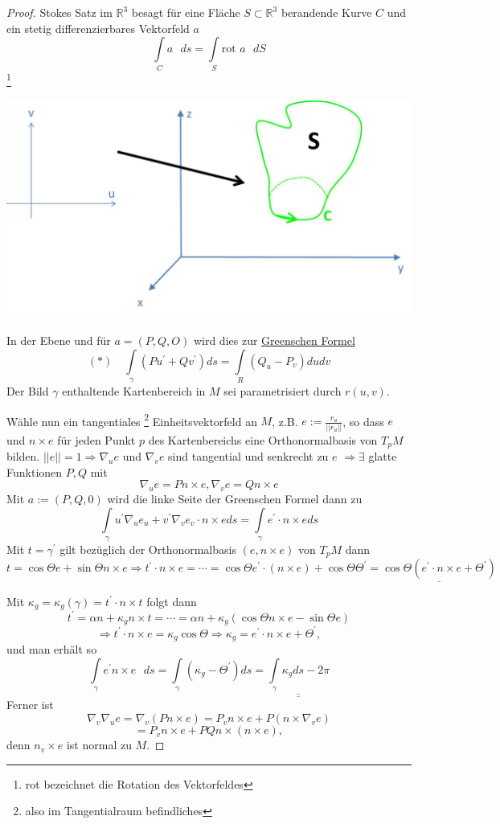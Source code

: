 \documentclass[a4paper,11pt,notitlepage]{report}
\theoremstyle{definition}
\newcommand{\R}{{\ensuremath{\mathbb{R}}}}
\begin{document}
\begin{proof}
	Stokes Satz im $\R^3$ besagt für eine Fläche $S \subset \R^3$ berandende Kurve $C$ und ein stetig differenzierbares Vektorfeld $a$
	$$\int\limits_{C}{a \text{ } ds} = \int\limits_{S}{\text{rot }a \text{ } dS}$$ \footnote{rot bezeichnet die Rotation des Vektorfeldes}
	\begin{center}
		\includegraphics[scale=0.3]{images/2012_02_02_Bild3.jpg}
	\end{center}
	In der Ebene und für $a =(P,Q,O)$ wird dies zur \underline{Greenschen Formel}
	$$(*) \quad \int\limits_{\gamma}{(P u^\prime + Q v^\prime) ds} = \int\limits_{R}{(Q_u - P_v) dudv}$$
	Der Bild $\gamma$ enthaltende Kartenbereich in $M$ sei parametrisiert durch $r(u,v)$.
	
	Wähle nun ein tangentiales \footnote{also im Tangentialraum befindliches} Einheitsvektorfeld an $M$, z.B. $e := \frac{r_u}{||r_u||}$, so dass $e$ und $n \times e$ für jeden Punkt $p$ des Kartenbereichs eine Orthonormalbasis von $T_pM$ bilden.
	$||e|| = 1 \Rightarrow \nabla_u e$ und $\nabla_v e$ sind tangential und senkrecht zu $e$ $\Rightarrow \exists$ glatte Funktionen $P,Q$ mit 
	$$\nabla_u e = P n \times e, \nabla_v e = Q n \times e$$
	Mit $a:= (P,Q,0)$ wird die linke Seite der Greenschen Formel dann zu
	$$\int\limits_{\gamma}{u^\prime \nabla_u e_u + v^\prime \nabla_v e_v} \cdot n \times e ds = \int\limits_{\gamma}{e^\prime \cdot n \times e ds}$$
	Mit $t = \gamma^\prime$ gilt bezüglich der Orthonormalbasis $(e, n \times e)$ von $T_pM$ dann
	$$t = \cos \Theta e + \sin \Theta n \times e \Rightarrow t^\prime \cdot n \times e = \cdots = \cos \Theta e^\prime \cdot (n \times e) + \cos \Theta \Theta^\prime = \underline{\cos \Theta (e^\prime \cdot n \times e + \Theta^\prime)}$$
	
	Mit $\kappa_g = \kappa_g(\gamma) = t^\prime \cdot n \times t$ folgt dann 
	$$t^\prime = \alpha n + \kappa_g n \times t = \cdots = \alpha n + \kappa_g (\cos \Theta n \times e - \sin \Theta e)$$
	$$\Rightarrow t^\prime \cdot n \times e = \kappa_g \cos \Theta \Rightarrow \kappa_g = e^\prime \cdot n \times e + \Theta^\prime,$$ und man erhält so
	$$\int\limits_{\gamma}{e^\prime n \times e \text{ } ds} = \int\limits_{\gamma}{(\kappa_g - \Theta^\prime) ds} = \underline{\underline{\int\limits_{\gamma}{\kappa_g ds} - 2 \pi}}$$
	Ferner ist $$\nabla_v \nabla_u e = \nabla_v (P n \times e) = P_v n \times e + P(n \times \nabla_v e)$$
	$$= P_v n \times e + PQ n \times (n \times e),$$
	denn $n_v \times e$ ist normal zu $M$.
	

\end{proof}
\end{document}
